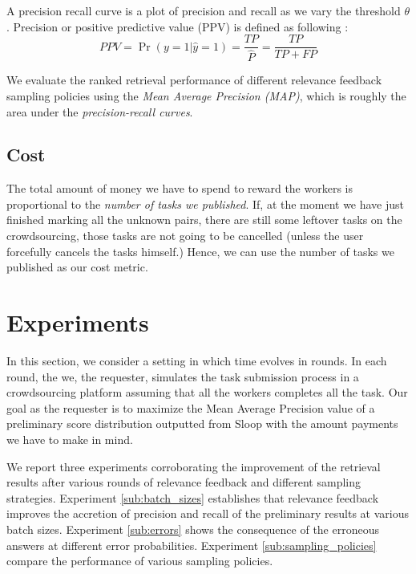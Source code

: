 A precision recall curve is a plot of precision and recall as we  vary the
threshold $\theta$. Precision or positive predictive value (PPV) is defined as
following \cite{manning2008introduction}: $$PPV = \Pr{(y=1|\hat{y}=1)} =
\frac{TP}{\hat{P}} = \frac{TP}{TP+FP}$$

We evaluate the ranked retrieval performance of different relevance feedback
sampling policies using the \emph{Mean Average Precision (MAP)}, which is
roughly the area under the \emph{precision-recall curves}.

\subsection{Cost} %
\label{sub:cost}

The total amount of money we have to spend to reward the workers is
proportional to the \emph{number of tasks we published}. If, at the moment we
have just finished marking all the unknown pairs, there are still some leftover
tasks on the crowdsourcing, those tasks are not going to be cancelled (unless
the user forcefully cancels the tasks himself.) Hence, we can use the number of
tasks we published as our cost metric.


\section{Experiments} %
\label{sec:experiments}

In this section, we consider a setting in which time evolves in rounds. In each
round, the we, the requester, simulates the task submission process in a
crowdsourcing platform assuming that all the workers completes all the task.
Our goal as the requester is to maximize the Mean Average Precision value of a
preliminary score distribution outputted from Sloop with the amount payments we
have to make in mind.

We report three experiments corroborating the improvement of the retrieval
results after various rounds of relevance feedback and different sampling
strategies.  Experiment \ref{sub:batch_sizes} establishes that relevance
feedback improves the accretion of precision and recall of the preliminary
results at various batch sizes.  Experiment \ref{sub:errors} shows the
consequence of the erroneous answers at different error probabilities.
Experiment \ref{sub:sampling_policies} compare the performance of various
sampling policies.

